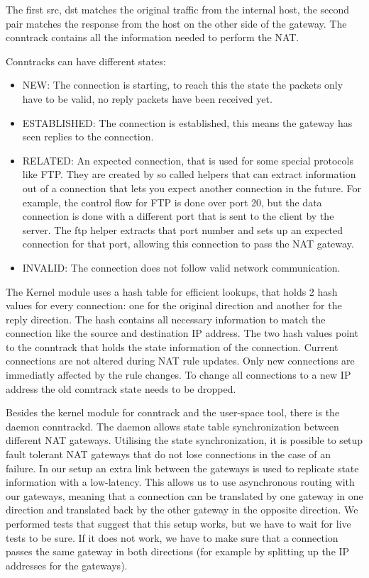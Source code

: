 \documentclass{report}
\begin{document}
The first src, dst matches the original traffic from the internal host,
the second pair matches the response from the host on the other side of
the gateway. The conntrack contains all the information needed to
perform the NAT.

Conntracks can have different states:

\begin{itemize}
\item
  NEW: The connection is starting, to reach this the state the packets
  only have to be valid, no reply packets have been received yet.
\item
  ESTABLISHED: The connection is established, this means the gateway has
  seen replies to the connection.
\item
  RELATED: An expected connection, that is used for some special
  protocols like FTP. They are created by so called helpers that can
  extract information out of a connection that lets you expect another
  connection in the future. For example, the control flow for FTP is done
  over port 20, but the data connection is done with a different port
  that is sent to the client by the server. The ftp helper extracts that
  port number and sets up an expected connection for that port, allowing
  this connection to pass the NAT gateway.
\item
  INVALID: The connection does not follow valid network communication.
\end{itemize}

The Kernel module uses a hash table for efficient lookups, that holds 2
hash values for every connection: one for the original direction and another
for the reply direction. The hash contains all necessary information to
match the connection like the source and destination IP address. The two
hash values point to the conntrack that holds the state information of
the connection. Current connections are not altered during NAT rule updates.
Only new connections are immediatly affected by the rule changes. To change all
connections to a new IP address the old conntrack state needs to be dropped.

Besides the kernel module for conntrack and the user-space tool, there is the
daemon conntrackd. The daemon allows state table synchronization
between different NAT gateways. Utilising the state synchronization, it is
possible to setup fault tolerant NAT gateways that do not lose
connections in the case of an failure. In our setup an extra link
between the gateways is used to replicate state information with a low-latency.
This allows us to use asynchronous routing with our gateways, meaning that a
connection can be translated by one gateway in one
direction and translated back by the other gateway in the opposite
direction. We performed tests that suggest that this setup works, but we have
to wait for live tests to be sure. If it does not work,
we have to make sure that a connection passes the same gateway in both
directions (for example by splitting up the IP addresses for the
gateways).
\end{document}
